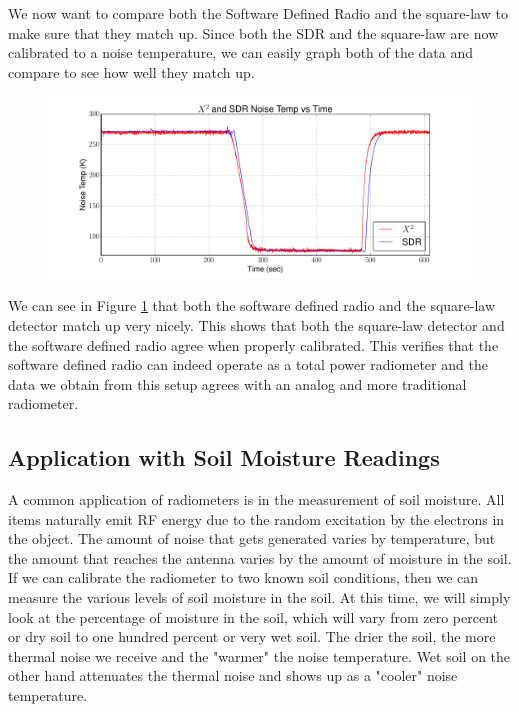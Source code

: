 We now want to compare both the Software Defined Radio and the square-law to make sure that they match up.  Since both the SDR and the square-law are now calibrated to a noise temperature, we can easily graph both of the data and compare to see how well they match up.

\begin{figure}[h!tb] \centering

\includegraphics[width=\textwidth]{Experiments/Exp1/x2_SDR_Calibrated.pdf}

\label{X2_SDR_Both}
\end{figure}

We can see in Figure \ref{X2_SDR_Both} that both the software defined radio and the square-law detector match up very nicely.  This shows that both the square-law detector and the software defined radio agree when properly calibrated.  This verifies that the software defined radio can indeed operate as a total power radiometer and the data we obtain from this setup agrees with an analog and more traditional radiometer.
\subsection{Application with Soil Moisture Readings}
A common application of radiometers is in the measurement of soil moisture.  All items naturally emit RF energy due to the random excitation by the electrons in the object.  The amount of noise that gets generated varies by temperature, but the amount that reaches the antenna varies by the amount of moisture in the soil.  If we can calibrate the radiometer to two known soil conditions, then we can measure the various levels of soil moisture in the soil.  At this time, we will simply look at the percentage of moisture in the soil, which will vary from zero percent or dry soil to one hundred percent or very wet soil.  The drier the soil, the more thermal noise we receive and the "warmer" the noise temperature.  Wet soil on the other hand attenuates the thermal noise and shows up as a "cooler" noise temperature.  

